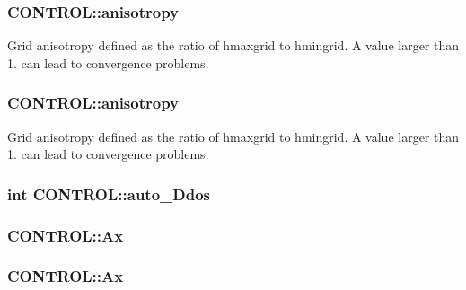 \hypertarget{struct_c_o_n_t_r_o_l_a3f912b49c5388eccc0eabe0b47980ce2}{
\subsubsection[{anisotropy}]{ C\-O\-N\-T\-R\-O\-L\-::anisotropy}}\label{struct_c_o_n_t_r_o_l_a3f912b49c5388eccc0eabe0b47980ce2}
Grid anisotropy defined as the ratio of hmaxgrid to hmingrid. A value larger than 1. can lead to convergence problems. \hypertarget{struct_c_o_n_t_r_o_l_a5503df1a9b370e7600417d31ec79512b}{
\subsubsection[{anisotropy}]{ C\-O\-N\-T\-R\-O\-L\-::anisotropy}}\label{struct_c_o_n_t_r_o_l_a5503df1a9b370e7600417d31ec79512b}
Grid anisotropy defined as the ratio of hmaxgrid to hmingrid. A value larger than 1. can lead to convergence problems. \hypertarget{struct_c_o_n_t_r_o_l_ac8e8e10a6cfa7b9dd7fd67816c9c2846}{
\subsubsection[{auto\-\_\-3\-Ddos}]{\setlength{\rightskip}{0pt plus 5cm}int C\-O\-N\-T\-R\-O\-L\-::auto\-\_\-Ddos}}\label{struct_c_o_n_t_r_o_l_ac8e8e10a6cfa7b9dd7fd67816c9c2846}
\hypertarget{struct_c_o_n_t_r_o_l_a5dd931d3531d43df21b87ff29dd4512d}{
\subsubsection[{Ax}]{ C\-O\-N\-T\-R\-O\-L\-::\-Ax}}\label{struct_c_o_n_t_r_o_l_a5dd931d3531d43df21b87ff29dd4512d}
\hypertarget{struct_c_o_n_t_r_o_l_ad1640927a57876f14da88af42d9fdfbd}{
\subsubsection[{Ax}]{ C\-O\-N\-T\-R\-O\-L\-::\-Ax}}\label{struct_c_o_n_t_r_o_l_ad1640927a57876f14da88af42d9fdfbd}
